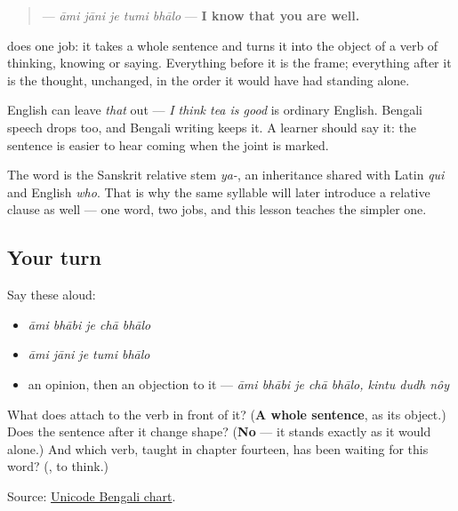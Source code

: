 \begin{quote}
\textbf{    } — \emph{āmi jāni je tumi bhālo} — \textbf{I know that you are well.}
\end{quote}

\textbf{} does one job: it takes a whole sentence and turns it into the object of a verb of thinking, knowing or saying. Everything before it is the frame; everything after it is the thought, unchanged, in the order it would have had standing alone.

\begin{grammarlens}[title={Grammar Lens: what English drops and Bengali keeps}]
English can leave \emph{that} out — \emph{I think tea is good} is ordinary English. Bengali speech drops \textbf{} too, and Bengali writing keeps it. A learner should say it: the sentence is easier to hear coming when the joint is marked.

The word is the Sanskrit relative stem \emph{ya-}, an inheritance shared with Latin \emph{qui} and English \emph{who}. That is why the same syllable will later introduce a relative clause as well — one word, two jobs, and this lesson teaches the simpler one.
\end{grammarlens}

\subsection*{Your turn}
Say these aloud:

\begin{itemize}
\raggedright
  \item \emph{āmi bhābi je chā bhālo}
  \item \emph{āmi jāni je tumi bhālo}
  \item an opinion, then an objection to it — \emph{āmi bhābi je chā bhālo, kintu dudh nôy}
\end{itemize}

\begin{tcolorbox}[breakable,colback=teal!4,colframe=teal!35!black,title={Before you move on}]
What does \textbf{} attach to the verb in front of it? (\textbf{A whole sentence}, as its object.) Does the sentence after it change shape? (\textbf{No} — it stands exactly as it would alone.) And which verb, taught in chapter fourteen, has been waiting for this word? (\textbf{}, to think.)

Source: \href{https://www.unicode.org/charts/PDF/U0980.pdf}{Unicode Bengali chart}.
\end{tcolorbox}
